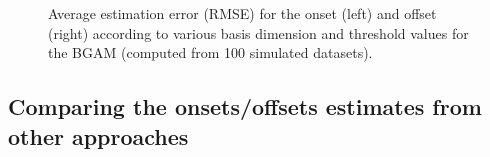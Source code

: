 \documentclass[
  man,
  floatsintext,
  longtable,
  a4paper,
  nolmodern,
  notxfonts,
  notimes,
  colorlinks=true,linkcolor=blue,citecolor=blue,urlcolor=blue]{apa7}
\begin{document}
\begin{figure}[!htb]

\caption{\label{fig-onset-error}Average estimation error (RMSE) for the
onset (left) and offset (right) according to various basis dimension and
threshold values for the BGAM (computed from 100 simulated datasets).}


\end{figure}%

\newpage

\subsection{Comparing the onsets/offsets estimates from other
approaches}\label{comparing-the-onsetsoffsets-estimates-from-other-approaches}
\end{document}

